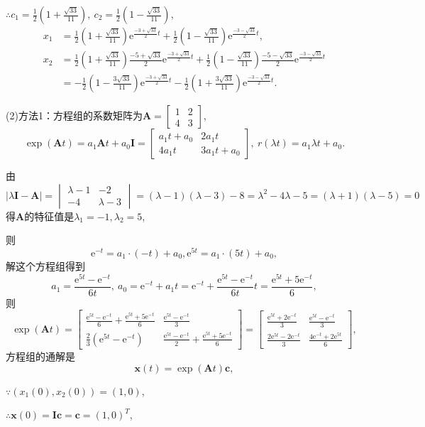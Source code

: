 \documentclass[12pt,UTF8]{ctexart}
\newcommand{\me}[0]{\mathrm e}
\begin{document}
\begin{enumerate}
$\therefore c_1=\frac12(1+\frac{\sqrt{33}}{11}),\ c_2=\frac12(1-\frac{\sqrt{33}}{11})$,
\[\begin{aligned}
x_1&=\frac12(1+\frac{\sqrt{33}}{11})\me^{\frac{-3+\sqrt{33}}2t}+\frac12(1-\frac{\sqrt{33}}{11})\me^{\frac{-3-\sqrt{33}}2t},\\
x_2&=\frac12(1+\frac{\sqrt{33}}{11})\frac{-5+\sqrt{33}}2\me^{\frac{-3+\sqrt{33}}2t}+\frac12(1-\frac{\sqrt{33}}{11})\frac{-5-\sqrt{33}}2\me^{\frac{-3-\sqrt{33}}2t}\\
&=-\frac12(1-\frac{3\sqrt{33}}{11})\me^{\frac{-3+\sqrt{33}}2t}-\frac12(1+\frac{3\sqrt{33}}{11})\me^{\frac{-3-\sqrt{33}}2t}.
\end{aligned}\]

(2)方法1：方程组的系数矩阵为$\bm A=\begin{bmatrix}1&2\\4&3\end{bmatrix}$, 
\[\exp(\bm At)=a_1\bm At+a_0\bm I=\begin{bmatrix}a_1t+a_0&2a_1t\\4a_1t&3a_1t+a_0\end{bmatrix},\ r(\lambda t)=a_1\lambda t+a_0.\]

由$|\lambda\bm I-\bm A|=\begin{vmatrix}\lambda-1&-2\\-4&\lambda-3\end{vmatrix}=(\lambda-1)(\lambda-3)-8=\lambda^2-4\lambda-5=(\lambda+1)(\lambda-5)=0$得$\bm A$的特征值是$\lambda_1=-1,\lambda_2=5$,

则
\[\me^{-t}=a_1\cdot(-t)+a_0,\me^{5t}=a_1\cdot(5t)+a_0,\]
解这个方程组得到
\[a_1=\frac{\me^{5t}-\me^{-t}}{6t},\ a_0=\me^{-t}+a_1t=\me^{-t}+\frac{\me^{5t}-\me^{-t}}{6t}t=\frac{\me^{5t}+5\me^{-t}}6,\]
则
\[\exp(\bm At)=\begin{bmatrix}\frac{\me^{5t}-\me^{-t}}6+\frac{\me^{5t}+5\me^{-t}}6&\frac{\me^{5t}-\me^{-t}}3\\\frac23(\me^{5t}-\me^{-t})&\frac{\me^{5t}-\me^{-t}}2+\frac{\me^{5t}+5\me^{-t}}6\end{bmatrix}=\begin{bmatrix}\frac{\me^{5t}+2\me^{-t}}3&\frac{\me^{5t}-\me^{-t}}3\\\frac{2\me^{5t}-2\me^{-t}}3&\frac{4\me^{-t}+2\me^{5t}}6\end{bmatrix},\]
方程组的通解是
\[\bm x(t)=\exp(\bm At)\bm c,\]

$\because(x_1(0),x_2(0))=(1,0)$,

$\therefore\bm x(0)=\bm I\bm c=\bm c=(1,0)^T$,


\end{enumerate}
\end{document}

